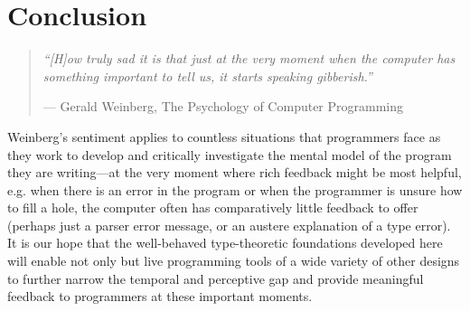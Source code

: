 \newcommand{\discussionSection}{Conclusion}
\section{\discussionSection} %
\label{sec:discussion}

\begin{comment}
To conclude, we quote Weinberg from The Psychology of Computer Programming (1998): ``how truly sad it is that just at the very moment
when the computer has something important to tell us, it starts
speaking gibberish.''
\end{comment}
\vspace{3pt}
\begin{quote}
\textit{``[H]ow truly sad it is that just at the very moment
when the computer has something important to tell us, it starts
speaking gibberish.''}

\vspace{3pt}

\hfill{}--- Gerald Weinberg, The Psychology of Computer Programming \cite{weinberg1971psychology}
\end{quote}
\vspace{3pt}

\noindent
%
Weinberg's sentiment applies to countless situations that programmers face as they work to develop and critically investigate the mental model of the program they are writing---at the very moment where rich feedback might be most helpful, e.g. when there is an error in the program or when the programmer is unsure how to fill a hole, the computer often has comparatively little feedback to offer (perhaps just a parser error message, or an austere explanation of a type error). 
%
%
%
It is our hope that the well-behaved  type-theoretic foundations developed here will enable not only \Hazel but live programming tools of a wide variety of other designs to further narrow the temporal and perceptive gap and provide meaningful feedback to programmers at these important   moments. 


